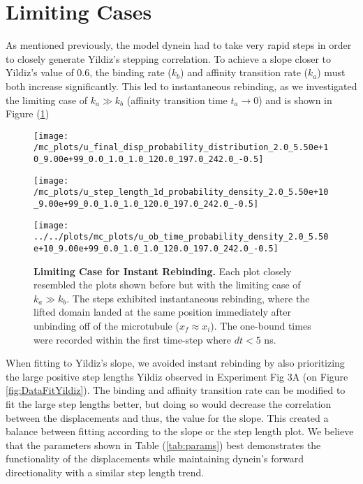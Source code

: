 \newpage
\section{Limiting Cases}\label{sec:LimitingCases} 

As mentioned previously, the model dynein had to take very rapid steps in order to closely generate Yildiz's stepping correlation. To achieve a slope closer to Yildiz's value of 0.6, the binding rate ($k_b$) and affinity transition rate ($k_a$) must both increase significantly. This led to instantaneous rebinding, as we investigated the limiting case of $k_a\gg k_b$ (affinity transition time $t_a\to 0$) and is shown in Figure (\ref{fig:DataFitYildiz99})

\begin{figure}[H]
	\begin{minipage}[b]{0.5\textwidth}
	\texttt{[image: /mc\_plots/u\_final\_disp\_probability\_distribution\_2.0\_5.50e+10\_9.00e+99\_0.0\_1.0\_1.0\_120.0\_197.0\_242.0\_-0.5]}
	\end{minipage}
	\begin{minipage}[b]{0.6\textwidth}		
	\texttt{[image: /mc\_plots/u\_step\_length\_1d\_probability\_density\_2.0\_5.50e+10\_9.00e+99\_0.0\_1.0\_1.0\_120.0\_197.0\_242.0\_-0.5]}
	\end{minipage}	
	\begin{center}
	\texttt{[image: ../../plots/mc\_plots/u\_ob\_time\_probability\_density\_2.0\_5.50e+10\_9.00e+99\_0.0\_1.0\_1.0\_120.0\_197.0\_242.0\_-0.5]}
	\end{center}	
	\caption[Limiting Case]{\textbf{Limiting Case for Instant Rebinding.} Each plot closely resembled the plots shown before but with the limiting case of $k_a\gg k_b$. The steps exhibited instantaneous rebinding, where the lifted domain landed at the same position immediately after unbinding off of the microtubule ($x_f\approx x_i$). The one-bound times were recorded within the first time-step where $dt<5$ ns.} 
	\label{fig:DataFitYildiz99}
\end{figure}

When fitting to Yildiz's slope, we avoided instant rebinding by also prioritizing the large positive step lengths Yildiz observed in Experiment Fig 3A (on Figure \ref{fig:DataFitYildiz}). The binding and affinity transition rate can be modified to fit the large step lengths better, but doing so would decrease the correlation between the displacements and thus, the value for the slope. This created a balance between fitting according to the slope or the step length plot. We believe that the parameters shown in Table (\ref{tab:params}) best demonstrates the functionality of the displacements while maintaining dynein's forward directionality with a similar step length trend.

